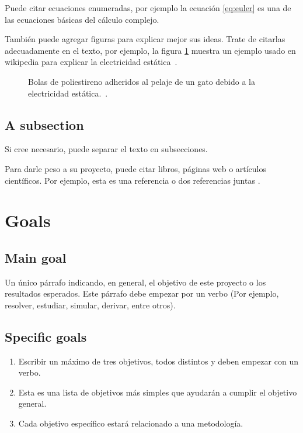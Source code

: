 \documentclass[MAIN.tex]{subfiles}
\begin{document}
Puede citar ecuaciones enumeradas, por ejemplo la ecuación
\eqref{eq:euler} es una de las ecuaciones básicas del cálculo
complejo.

También puede agregar figuras para explicar mejor sus ideas. Trate de
citarlas adecuadamente en el texto, por ejemplo, la figura
\ref{fig:figura-interesante} muestra un ejemplo usado en wikipedia
para explicar la electricidad estática~\cite{wikistatic}.

\begin{figure}[h!]
  \centering
  \caption{Bolas de poliestireno adheridos al pelaje de un gato debido
    a la electricidad estática.~\cite{wikistatic}.}
  \label{fig:figura-interesante}
\end{figure}

\subsection{A subsection}

Si cree necesario, puede separar el texto en subsecciones.

Para darle peso a su proyecto, puede citar libros, páginas web o artículos científicos. Por ejemplo, esta es una referencia 
\cite{AF:2003} o dos referencias juntas \cite{CEL:arXiv, MS}.

\section{Goals}

\subsection{Main goal}

Un único párrafo indicando, en general, el objetivo de este proyecto o
los resultados esperados. Este párrafo debe empezar por un verbo (Por
ejemplo, resolver, estudiar, simular, derivar, entre otros).

\subsection{Specific goals}
\begin{enumerate}
\item Escribir un máximo de tres objetivos, todos distintos y deben empezar con un verbo.
\item Esta es una lista de objetivos más simples que ayudarán a cumplir el objetivo general.
\item Cada objetivo específico estará relacionado a una metodología.
\end{enumerate}
\end{document}
